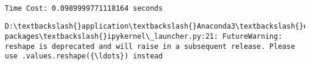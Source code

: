 \documentclass[11pt]{article}
\begin{document}
    \begin{Verbatim}[commandchars=\\\{\}]

Time Cost: 0.0989999771118164 seconds

    \end{Verbatim}

    \begin{Verbatim}[commandchars=\\\{\}]
D:\textbackslash{}application\textbackslash{}Anaconda3\textbackslash{}envs\textbackslash{}pyalgo\textbackslash{}lib\textbackslash{}site-packages\textbackslash{}ipykernel\_launcher.py:21: FutureWarning: reshape is deprecated and will raise in a subsequent release. Please use .values.reshape({\ldots}) instead

    \end{Verbatim}
\end{document}
